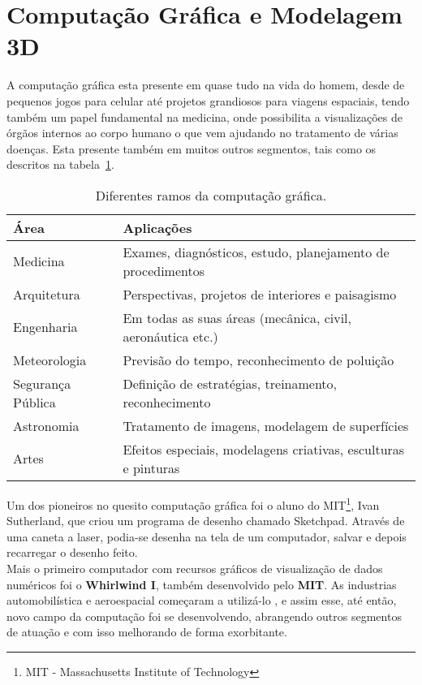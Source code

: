 \section{Computação Gráfica e Modelagem 3D}
A computação gráfica esta presente em quase tudo na vida do homem, desde de pequenos jogos para celular até projetos grandiosos para viagens espaciais, tendo também um papel fundamental na medicina, onde possibilita a visualizações de órgãos internos ao corpo humano o que vem ajudando no tratamento de várias doenças\cite{comp_grafica_h}\cite{azevedo}\cite{kirne}. Esta presente também em muitos outros segmentos, tais como os descritos na tabela~\ref{tab:comp_teoria}. \\

\begin{table}
\centering
\begin{tabular}{|l|l|}
	\hline
	Área & Aplicações \\ \hline
	Medicina &  Exames, diagnósticos, estudo, planejamento de procedimentos\\ \hline
	Arquitetura & Perspectivas, projetos de interiores e paisagismo\\ \hline
	Engenharia & Em todas as suas áreas (mecânica, civil, aeronáutica etc.)\\ \hline
	Meteorologia & Previsão do tempo, reconhecimento de poluição\\ \hline
	Segurança Pública & Definição de estratégias, treinamento, reconhecimento\\ \hline
	Astronomia & Tratamento de imagens, modelagem de superfícies\\ \hline
	Artes & Efeitos especiais, modelagens criativas, esculturas e pinturas\\
	\hline
\end{tabular}
\caption{Diferentes ramos da computação gráfica.}
\label{tab:comp_teoria}
\end{table}

Um dos pioneiros no quesito computação gráfica foi o aluno do MIT\footnote{MIT - Massachusetts Institute of Technology}, Ivan Sutherland, que criou um programa de desenho chamado Sketchpad\cite{sutherland}. Através de uma caneta a laser, podia-se desenha na tela de um computador, salvar e depois recarregar o desenho feito.\\

 Mais o primeiro computador com recursos gráficos de visualização de dados numéricos foi o \textbf{Whirlwind I}, também desenvolvido pelo \textbf{MIT}. As industrias automobilística e aeroespacial começaram a utilizá-lo , e assim esse, até então, novo campo da computação foi se desenvolvendo, abrangendo outros segmentos de atuação e com isso melhorando de forma exorbitante\cite{comp_grafica_h2}.  \\

